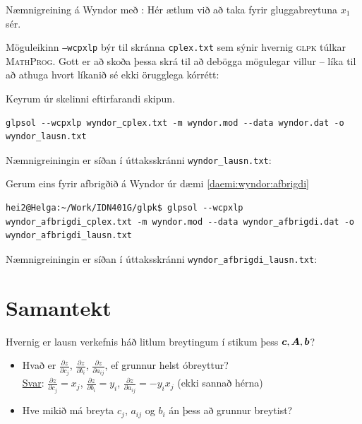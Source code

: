 \begin{daemi} Næmnigreining á Wyndor með : Hér ætlum við að taka fyrir gluggabreytuna $x_1$ sér.

\begin{samepage}\end{samepage}
\end{daemi}
\newpage
\begin{lausnSYND}
Möguleikinn \texttt{--wcpxlp} býr til skránna \texttt{cplex.txt} sem sýnir hvernig \textsc{glpk} túlkar \textsc{MathProg}. Gott er að skoða þessa skrá til að debögga mögulegar villur -- líka til að athuga hvort líkanið sé ekki örugglega kórrétt:
\lstset{basicstyle=\tiny}
 

Keyrum úr skelinni eftirfarandi skipun.
\begin{lstlisting}
glpsol --wcpxlp wyndor_cplex.txt -m wyndor.mod --data wyndor.dat -o wyndor_lausn.txt 
\end{lstlisting}

Næmnigreiningin er síðan í úttaksskránni \texttt{wyndor\_lausn.txt}:


\newpage
Gerum eins fyrir afbrigðið á Wyndor úr dæmi \ref{daemi:wyndor:afbrigdi}
\begin{lstlisting}
hei2@Helga:~/Work/IDN401G/glpk$ glpsol --wcpxlp wyndor_afbrigdi_cplex.txt -m wyndor.mod --data wyndor_afbrigdi.dat -o wyndor_afbrigdi_lausn.txt 
\end{lstlisting}

Næmnigreiningin er síðan í úttaksskránni \texttt{wyndor\_afbrigdi\_lausn.txt}:


\lstset{basicstyle=\footnotesize}


\end{lausnSYND}
\section{Samantekt}
Hvernig er lausn verkefnis háð litlum breytingum í
stikum þess ${\mbox{\boldmath$c$}}, {\mbox{\boldmath$A$}}, {\mbox{\boldmath$b$}}$?

\begin{itemize}
\item Hvað er $\frac{\partial z}{\partial c_j}$, $\frac{\partial
    z}{\partial b_i}$, $\frac{\partial z}{\partial a_{ij}}$, ef
  grunnur helst óbreyttur?\\
  
  \underline{Svar}: $\frac{\partial z}{\partial c_j}=x_j$,
  $\frac{\partial z}{\partial b_i}= y_i$, $\frac{\partial
    z}{\partial a_{ij}}=-y_ix_j$ (ekki sannað hérna)\\

\item Hve mikið má breyta $c_j$, $a_{ij}$ og $b_i$ án þess að grunnur breytist?
\end{itemize}


